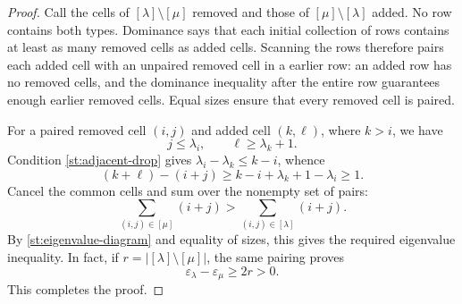\documentclass[reqno, 12pt]{article}
\numberwithin{equation}{section}
\theoremstyle{definition}
\begin{document}
\begin{proof}
Call the cells of $[\lambda]\setminus[\mu]$ removed and those
of $[\mu]\setminus[\lambda]$ added.  No row contains both types.
Dominance says that each initial collection of rows contains at
least as many removed cells as added cells.  Scanning the rows
therefore pairs each added cell with an unpaired removed cell in
a earlier row: an added row has no removed cells, and the
dominance inequality after the entire row guarantees enough earlier
removed cells.  Equal sizes ensure that every removed cell is paired.

For a paired removed cell $(i,j)$ and added cell $(k,\ell)$,
where $k>i$, we have
\[
j\leq\lambda_i,\qquad \ell\geq\lambda_k+1.
\]
Condition \eqref{st:adjacent-drop} gives
$\lambda_i-\lambda_k\leq k-i$, whence
\begin{equation}\label{st:cell-level-increase}
(k+\ell)-(i+j)\geq k-i+\lambda_k+1-\lambda_i\geq1.
\end{equation}
Cancel the common cells and sum over the nonempty set of pairs:
\[
\sum_{(i,j)\in[\mu]}(i+j)
>
\sum_{(i,j)\in[\lambda]}(i+j).
\]
By \eqref{st:eigenvalue-diagram} and equality of sizes, this gives
the required eigenvalue inequality.  In fact, if
$r=|[\lambda]\setminus[\mu]|$, the same pairing proves
\begin{equation}\label{st:gap-lower-bound}
\varepsilon_\lambda-\varepsilon_\mu\geq2r>0.
\end{equation}
This completes the proof.
\end{proof}
\end{document}
